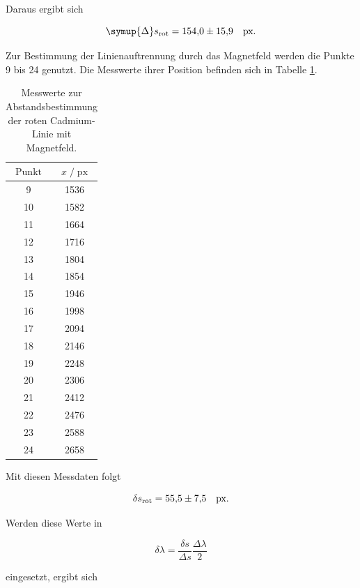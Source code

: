 Daraus ergibt sich 

\begin{equation*}
    \symup{\Delta} s_\text{rot} = \num{154.0+-15.9}\quad\text{px}.
\end{equation*}

Zur Bestimmung der Linienauftrennung durch das Magnetfeld werden die Punkte 9 bis 24 genutzt. Die Messwerte ihrer Position befinden sich in 
Tabelle \ref{tab:mess3}. 

\begin{table}[H]
    \centering
    \caption{Messwerte zur Abstandsbestimmung der roten Cadmium-Linie mit Magnetfeld.}
    \label{tab:mess3}
    \begin{tabular}{c c}
    \toprule
    $\text{Punkt}$ & $x \;/\; \text{px}$ \\
    \midrule
        9 & 1536\\
        10 & 1582\\
        11 & 1664\\
        12 & 1716\\
        13 & 1804\\
        14 & 1854\\
        15 & 1946\\
        16 & 1998\\
        17 & 2094\\
        18 & 2146\\
        19 & 2248\\
        20 & 2306\\
        21 & 2412\\
        22 & 2476\\
        23 & 2588\\
        24 & 2658\\
    \bottomrule
    \end{tabular}
\end{table}

Mit diesen Messdaten folgt

\begin{equation*}
    \delta s_\text{rot} = \num{55.5+-7.5}\quad \text{px}.    
\end{equation*}

Werden diese Werte in 

\begin{equation*}
    \delta \lambda = \frac{\delta s}{\Delta s}\frac{\Delta \lambda}{2}
\end{equation*}

eingesetzt, ergibt sich 

